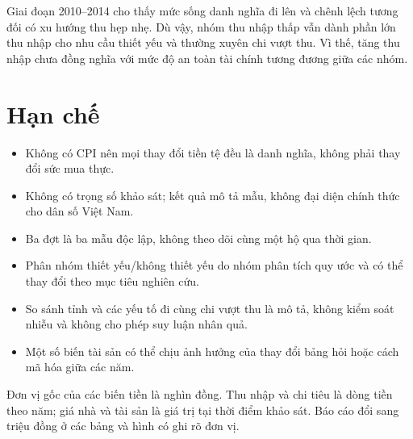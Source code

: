 \documentclass[11pt,a4paper]{article}
\begin{document}
\begin{suyluan}
Giai đoạn 2010--2014 cho thấy mức sống danh nghĩa đi lên và chênh lệch tương đối có xu hướng thu hẹp nhẹ. Dù vậy, nhóm thu nhập thấp vẫn dành phần lớn thu nhập cho nhu cầu thiết yếu và thường xuyên chi vượt thu. Vì thế, tăng thu nhập chưa đồng nghĩa với mức độ an toàn tài chính tương đương giữa các nhóm.
\end{suyluan}

\section{Hạn chế}

\begin{itemize}[leftmargin=1.35em,itemsep=4pt]
  \item Không có CPI nên mọi thay đổi tiền tệ đều là danh nghĩa, không phải thay đổi sức mua thực.
  \item Không có trọng số khảo sát; kết quả mô tả mẫu, không đại diện chính thức cho dân số Việt Nam.
  \item Ba đợt là ba mẫu độc lập, không theo dõi cùng một hộ qua thời gian.
  \item Phân nhóm thiết yếu/không thiết yếu do nhóm phân tích quy ước và có thể thay đổi theo mục tiêu nghiên cứu.
  \item So sánh tỉnh và các yếu tố đi cùng chi vượt thu là mô tả, không kiểm soát nhiễu và không cho phép suy luận nhân quả.
  \item Một số biến tài sản có thể chịu ảnh hưởng của thay đổi bảng hỏi hoặc cách mã hóa giữa các năm.
\end{itemize}

\vfill
{\footnotesize\color{muted}
Đơn vị gốc của các biến tiền là nghìn đồng. Thu nhập và chi tiêu là dòng tiền theo năm; giá nhà và tài sản là giá trị tại thời điểm khảo sát. Báo cáo đổi sang triệu đồng ở các bảng và hình có ghi rõ đơn vị.}
\end{document}
